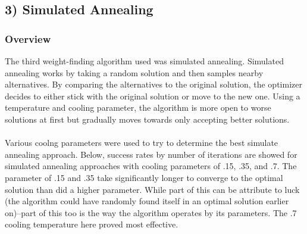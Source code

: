 \documentclass[h]{article}
\begin{document}
\subsection*{3) Simulated Annealing}  
\subsubsection*{Overview}
The third weight-finding algorithm used was simulated annealing.  Simulated 
annealing works by taking a random solution and then samples nearby 
alternatives.  By comparing the alternatives to the original solution, the 
optimizer decides to either stick with the original solution or move to the new 
one.  Using a temperature and cooling parameter, the algorithm is more open to 
worse solutions at first but gradually moves towards only accepting better 
solutions.
\\ \\
Various coolng parameters were used to try to determine the best simulate 
annealing approach.  Below, success rates by number of iterations are showed for 
simulated annealing approaches with cooling parameters of .15, .35, and .7.  The 
parameter of .15 and .35 take significantly longer to converge to the optimal 
solution than did a higher parameter.  While part of this can be attribute to 
luck (the algorithm could have randomly found itself in an optimal solution earlier 
on)--part of this too is the way the algorithm operates by its parameters.  The 
.7 cooling temperature here proved most effective.
\end{document}

